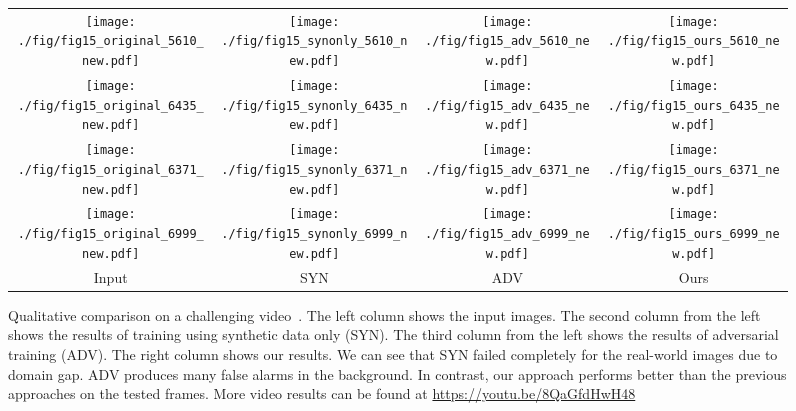 \documentclass[final]{IEEEtran}
\begin{document}
{\begin{minipage}{\textwidth}
\begin{figure*}
 \centering
 \setlength{\tabcolsep}{0.5pt}
 \begin{tabular}{cccc}
  	\texttt{[image: ./fig/fig15\_original\_5610\_new.pdf]}
 	&\texttt{[image: ./fig/fig15\_synonly\_5610\_new.pdf]}
    &\texttt{[image: ./fig/fig15\_adv\_5610\_new.pdf]}
 	&\texttt{[image: ./fig/fig15\_ours\_5610\_new.pdf]}\\
  	\texttt{[image: ./fig/fig15\_original\_6435\_new.pdf]}
 	&\texttt{[image: ./fig/fig15\_synonly\_6435\_new.pdf]}
    &\texttt{[image: ./fig/fig15\_adv\_6435\_new.pdf]}
 	&\texttt{[image: ./fig/fig15\_ours\_6435\_new.pdf]}\\
  	\texttt{[image: ./fig/fig15\_original\_6371\_new.pdf]}
 	&\texttt{[image: ./fig/fig15\_synonly\_6371\_new.pdf]}
    &\texttt{[image: ./fig/fig15\_adv\_6371\_new.pdf]}
 	&\texttt{[image: ./fig/fig15\_ours\_6371\_new.pdf]}\\
   	\texttt{[image: ./fig/fig15\_original\_6999\_new.pdf]}
 	&\texttt{[image: ./fig/fig15\_synonly\_6999\_new.pdf]}
    &\texttt{[image: ./fig/fig15\_adv\_6999\_new.pdf]}
 	&\texttt{[image: ./fig/fig15\_ours\_6999\_new.pdf]}\\
 	Input & SYN & ADV & Ours\\
    \end{tabular}
 \caption{Qualitative comparison on a challenging video~\cite{youtube-video}. The left column shows the input images. The second column from the left shows the results of training using synthetic data only (SYN). The third column from the left shows the results of adversarial training (ADV). The right column shows our results. We can see that SYN failed completely for the real-world images due to domain gap. ADV produces many false alarms in the background. In contrast, our approach performs better than the previous approaches on the tested frames. More video results can be found at \href{https://youtu.be/8QaGfdHwH48}{https://youtu.be/8QaGfdHwH48}}
\label{fig:visual} \end{figure*}




\end{minipage}}
\end{document}
